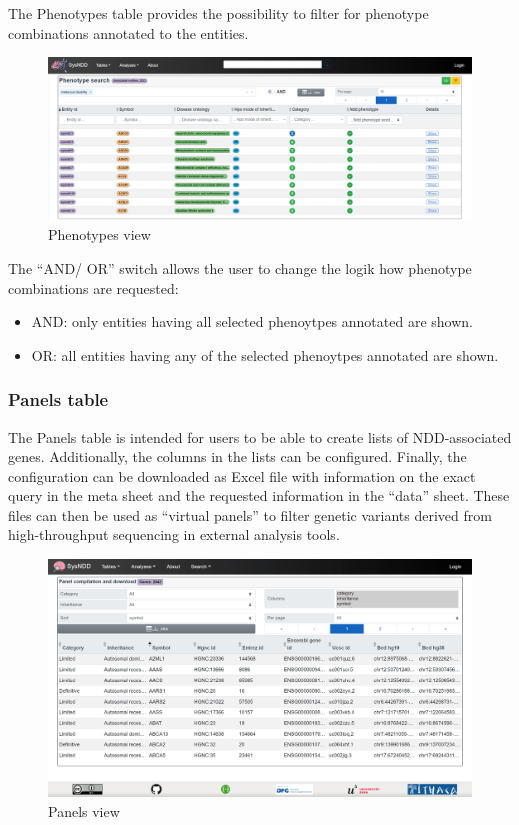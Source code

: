 \documentclass[
]{article}
\providecommand{\tightlist}{%
  \setlength{\itemsep}{0pt}\setlength{\parskip}{0pt}}
\begin{document}
The Phenotypes table provides the possibility to filter for phenotype combinations annotated to the entities.

\begin{figure}
\centering
\includegraphics{./static/img/02_09-sysndd.dbmr.unibe.ch_Phenotypes.png}
\caption{Phenotypes view}
\end{figure}

The ``AND/ OR'' switch allows the user to change the logik how phenotype combinations are requested:

\begin{itemize}
\tightlist
\item
  AND: only entities having all selected phenoytpes annotated are shown.
\item
  OR: all entities having any of the selected phenoytpes annotated are shown.
\end{itemize}

\hypertarget{panels-table}{%
\subsubsection{Panels table}\label{panels-table}}

The Panels table is intended for users to be able to create lists of NDD-associated genes. Additionally, the columns in the lists can be configured.
Finally, the configuration can be downloaded as Excel file with information on the exact query in the meta sheet and the requested information in the ``data'' sheet.
These files can then be used as ``virtual panels'' to filter genetic variants derived from high-throughput sequencing in external analysis tools.

\begin{figure}
\centering
\includegraphics{./static/img/02_10-sysndd.dbmr.unibe.ch_Panels.png}
\caption{Panels view}
\end{figure}
\end{document}
